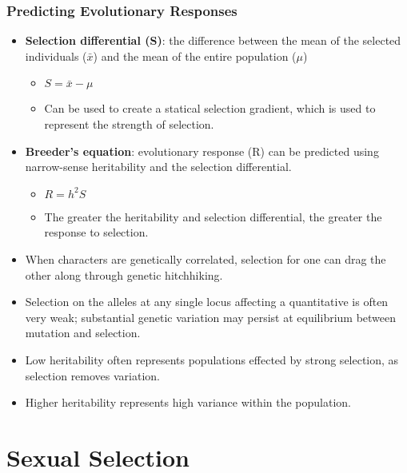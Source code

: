 \documentclass[12pt,a4paper]{article}
\begin{document}
\begin{itemize}
    \subsubsection{Predicting Evolutionary Responses}
    \begin{itemize}
        \item \textbf{Selection differential (S)}: the difference between the mean of the selected individuals ($\bar{x}$) and the mean of the entire population ($\mu$)
            \begin{itemize}
                \item \(S=\bar{x}-\mu\)
                \item Can be used to create a statical selection gradient, which is used to represent the strength of selection.
            \end{itemize}
        \item \textbf{Breeder's equation}: evolutionary response (R) can be predicted using narrow-sense heritability and the selection differential.
            \begin{itemize}
                \item {\color{o-Sun}\(R=h^2S\)}
                \item The greater the heritability and selection differential, the greater the response to selection.
            \end{itemize}
        \item When characters are genetically correlated, selection for one can drag the other along through genetic hitchhiking.
        \item Selection on the alleles at any single locus affecting a quantitative is often very weak; substantial genetic variation may persist at equilibrium between mutation and selection.
        \item {\color{o-Sun}Low heritability} often represents populations effected by {\color{o-Sun}strong selection}, as selection removes variation.
        \item {\color{o-Sun}Higher heritability} represents {\color{o-Sun}high variance} within the population. 
    \end{itemize}
\end{itemize}

\setcounter{section}{10}
\clearpage
\section{Sexual Selection}
\end{document}
